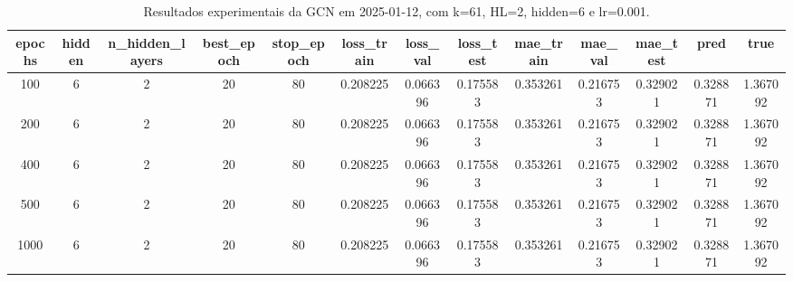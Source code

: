 \begin{table}[h]
\centering
\caption{Resultados experimentais da GCN em 2025-01-12, com k=61, HL=2, hidden=6 e lr=0.001.}
\label{tab:gcn_results_k61_hl2_h6_d20250112}
\begin{tabular}{ccccccccccccc}
\toprule
epochs & hidden & n\_hidden\_layers & best\_epoch & stop\_epoch & loss\_train & loss\_val & loss\_test & mae\_train & mae\_val & mae\_test & pred & true \\
\midrule
100 & 6 & 2 & 20 & 80 & 0.208225 & 0.066396 & 0.175583 & 0.353261 & 0.216753 & 0.329021 & 0.328871 & 1.367092 \\
200 & 6 & 2 & 20 & 80 & 0.208225 & 0.066396 & 0.175583 & 0.353261 & 0.216753 & 0.329021 & 0.328871 & 1.367092 \\
400 & 6 & 2 & 20 & 80 & 0.208225 & 0.066396 & 0.175583 & 0.353261 & 0.216753 & 0.329021 & 0.328871 & 1.367092 \\
500 & 6 & 2 & 20 & 80 & 0.208225 & 0.066396 & 0.175583 & 0.353261 & 0.216753 & 0.329021 & 0.328871 & 1.367092 \\
1000 & 6 & 2 & 20 & 80 & 0.208225 & 0.066396 & 0.175583 & 0.353261 & 0.216753 & 0.329021 & 0.328871 & 1.367092 \\
\bottomrule
\end{tabular}
\end{table}
